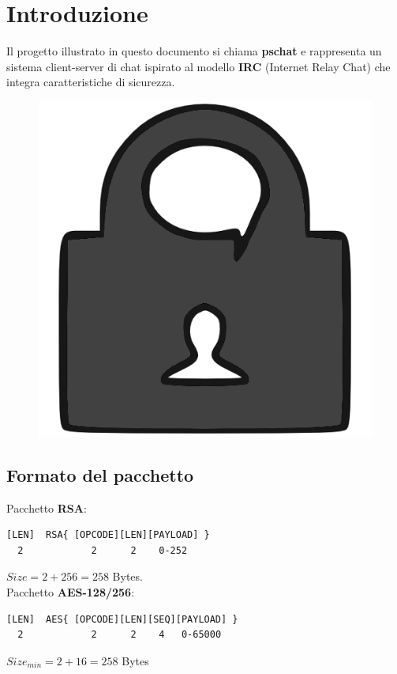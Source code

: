 \documentclass[a4paper,titlepage]{article}
\begin{document}
\section{Introduzione}  \thispagestyle{plain}
Il progetto illustrato in questo documento si chiama \textbf{pschat} e rappresenta un sistema client-server di chat ispirato al modello \textbf{IRC} (Internet Relay Chat) che integra caratteristiche di sicurezza.\\
\begin{figure}[H]
  \centering \includegraphics[scale=1.0]{../data/psc_orig.png}
\end{figure}

\subsection{Formato del pacchetto}

Pacchetto \textbf{RSA}:
\begin{verbatim}
[LEN]  RSA{ [OPCODE][LEN][PAYLOAD] }
  2            2      2    0-252
\end{verbatim}
$Size = 2 + 256= 258$ Bytes.\\

Pacchetto \textbf{AES-128/256}:
\begin{verbatim}
[LEN]  AES{ [OPCODE][LEN][SEQ][PAYLOAD] }
  2            2      2    4   0-65000
\end{verbatim}
$Size_{min} = 2 + 16= 258$ Bytes
\end{document}
